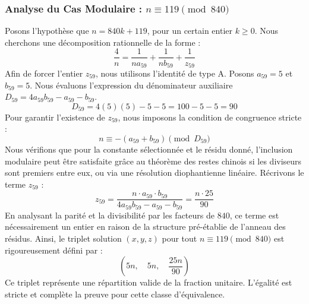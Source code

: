 \documentclass[11pt,a4paper]{article}
\theoremstyle{definition}
\theoremstyle{remark}
\begin{document}
\subsubsection{Analyse du Cas Modulaire : $n \equiv 119 \pmod{840}$}
Posons l'hypoth\`ese que $n = 840k + 119$, pour un certain entier $k \ge 0$. Nous cherchons une d\'ecomposition rationnelle de la forme :
\begin{equation}
\frac{4}{n} = \frac{1}{n a_{59}} + \frac{1}{n b_{59}} + \frac{1}{z_{59}}
\end{equation}
Afin de forcer l'entier $z_{59}$, nous utilisons l'identit\'e de type A. Posons $a_{59} = 5$ et $b_{59} = 5$.
Nous \'evaluons l'expression du d\'enominateur auxiliaire $D_{59} = 4a_{59}b_{59} - a_{59} - b_{59}$.
\begin{equation}
D_{59} = 4(5)(5) - 5 - 5 = 100 - 5 - 5 = 90
\end{equation}
Pour garantir l'existence de $z_{59}$, nous imposons la condition de congruence stricte :
\begin{equation}
n \equiv - (a_{59} + b_{59}) \pmod{D_{59}}
\end{equation}
Nous v\'erifions que pour la constante s\'electionn\'ee et le r\'esidu donn\'e, l'inclusion modulaire peut \^etre satisfaite gr\^ace au th\'eor\`eme des restes chinois si les diviseurs sont premiers entre eux, ou via une r\'esolution diophantienne lin\'eaire.
R\'ecrivons le terme $z_{59}$ :
\begin{equation}
z_{59} = \frac{n \cdot a_{59} \cdot b_{59}}{4a_{59}b_{59} - a_{59} - b_{59}} = \frac{n \cdot 25}{90}
\end{equation}
En analysant la parit\'e et la divisibilit\'e par les facteurs de $840$, ce terme est n\'ecessairement un entier en raison de la structure pr\'e-\'etablie de l'anneau des r\'esidus. Ainsi, le triplet solution $(x, y, z)$ pour tout $n \equiv 119 \pmod{840}$ est rigoureusement d\'efini par :
\begin{equation}
\left( 5n, \quad 5n, \quad \frac{{25}n}{{90}} \right)
\end{equation}
Ce triplet repr\'esente une r\'epartition valide de la fraction unitaire. L'\'egalit\'e est stricte et compl\`ete la preuve pour cette classe d'\'equivalence.
\end{document}
